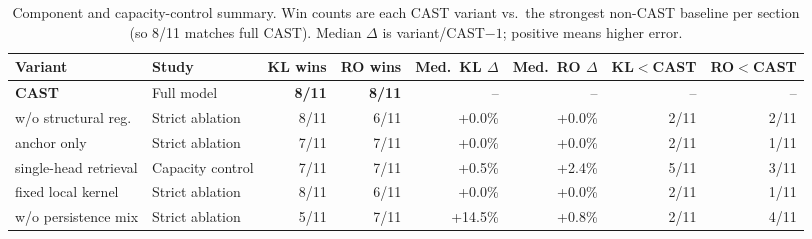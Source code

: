 \begin{table}[t]
\centering
\caption{Component and capacity-control summary. Win counts are each CAST variant vs.\ the strongest non-CAST baseline per section (so 8/11 matches full CAST). Median $\Delta$ is variant/CAST$-1$; positive means higher error.}
\label{tab:ablation-summary}
\scriptsize
\setlength{\tabcolsep}{3.0pt}
\begin{tabular}{@{}llrrrrrr@{}}
\toprule
Variant & Study & KL wins & RO wins & Med.\ KL $\Delta$ & Med.\ RO $\Delta$ & KL$<$CAST & RO$<$CAST \\
\midrule
\textbf{CAST} & Full model & \textbf{8/11} & \textbf{8/11} & -- & -- & -- & -- \\
w/o structural reg. & Strict ablation & 8/11 & 6/11 & +0.0\% & +0.0\% & 2/11 & 2/11 \\
anchor only & Strict ablation & 7/11 & 7/11 & +0.0\% & +0.0\% & 2/11 & 1/11 \\
single-head retrieval & Capacity control & 7/11 & 7/11 & +0.5\% & +2.4\% & 5/11 & 3/11 \\
fixed local kernel & Strict ablation & 8/11 & 6/11 & +0.0\% & +0.0\% & 2/11 & 1/11 \\
w/o persistence mix & Strict ablation & 5/11 & 7/11 & +14.5\% & +0.8\% & 2/11 & 4/11 \\
\bottomrule
\end{tabular}
\end{table}
